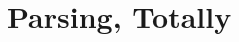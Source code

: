 \documentclass[sigplan,review,anonymous]{acmart}\settopmatter{printfolios=true}
\begin{document}
\section{Parsing, Totally}






\end{document}
